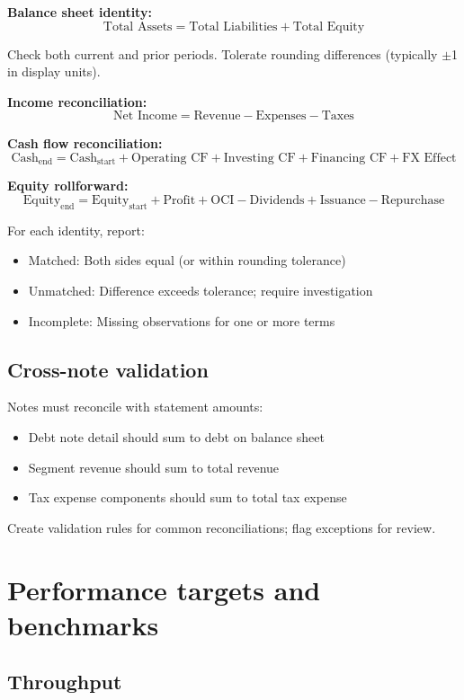 \textbf{Balance sheet identity:}
\[
\text{Total Assets} = \text{Total Liabilities} + \text{Total Equity}
\]

Check both current and prior periods. Tolerate rounding differences (typically $\pm$1
in display units).

\textbf{Income reconciliation:}
\[
\text{Net Income} = \text{Revenue} - \text{Expenses} - \text{Taxes}
\]

\textbf{Cash flow reconciliation:}
\[
\text{Cash}_{\text{end}} = \text{Cash}_{\text{start}} + \text{Operating CF} +
\text{Investing CF} + \text{Financing CF} + \text{FX Effect}
\]

\textbf{Equity rollforward:}
\[
\text{Equity}_{\text{end}} = \text{Equity}_{\text{start}} + \text{Profit} +
\text{OCI} - \text{Dividends} + \text{Issuance} - \text{Repurchase}
\]

For each identity, report:
\begin{itemize}
\item Matched: Both sides equal (or within rounding tolerance)
\item Unmatched: Difference exceeds tolerance; require investigation
\item Incomplete: Missing observations for one or more terms
\end{itemize}

\subsection{Cross-note validation}

Notes must reconcile with statement amounts:
\begin{itemize}
\item Debt note detail should sum to debt on balance sheet
\item Segment revenue should sum to total revenue
\item Tax expense components should sum to total tax expense
\end{itemize}

Create validation rules for common reconciliations; flag exceptions for review.

\section{Performance targets and benchmarks}

\subsection{Throughput}

